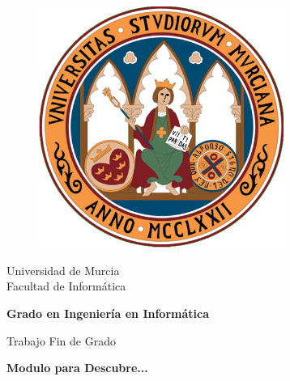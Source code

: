 
\begin{titlepage}
	\vspace*{\fill}
	\begin{center}
		\vspace*{-1in}
		\begin{figure}[htb]
			\begin{center}
				\includegraphics[width=8cm]{images/logo.png}
			\end{center}
		\end{figure}
		\vspace*{0.15in}
		Universidad de Murcia\\
		\vspace*{0.15in}
		Facultad de Informática \\
		\vspace*{0.6in}
		\begin{large}
			\textbf{Grado en Ingeniería en Informática}\\
		\end{large}
		\vspace*{0.1in}
		\begin{large}
			Trabajo Fin de Grado\\
		\end{large}
		\vspace*{0.2in}
		\begin{Large}
			\textbf{{\color{red}Modulo para Descubre...}} \\

\end{Large}
\end{center}
\end{titlepage}
